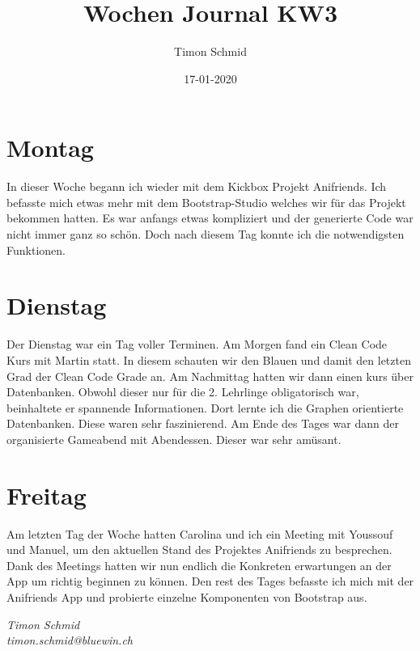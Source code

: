 \documentclass[12pt, titlepage]{article}
\title{Wochen Journal KW3}
\date{17-01-2020}
\author{Timon Schmid}
\begin{document}
  \maketitle

  \newpage


  \section{Montag}
  In dieser Woche begann ich wieder mit dem Kickbox Projekt Anifriends. Ich befasste mich etwas mehr
  mit dem Bootstrap-Studio welches wir für das Projekt bekommen hatten. Es war anfangs etwas
  kompliziert und der generierte Code war nicht immer ganz so schön. Doch nach diesem Tag
  konnte ich die notwendigsten Funktionen.

  \section{Dienstag}
  Der Dienstag war ein Tag voller Terminen. Am Morgen fand ein Clean Code Kurs mit Martin statt. In
  diesem schauten wir den Blauen und damit den letzten Grad der Clean Code Grade an. Am Nachmittag
  hatten wir dann einen kurs über Datenbanken. Obwohl dieser nur für die 2. Lehrlinge obligatorisch
  war, beinhaltete er spannende Informationen. Dort lernte ich die Graphen orientierte Datenbanken.
  Diese waren sehr faszinierend.
  Am Ende des Tages war dann der organisierte Gameabend mit Abendessen. Dieser war sehr amüsant.

  \section{Freitag}
  Am letzten Tag der Woche hatten Carolina und ich ein Meeting mit Youssouf und Manuel, um den aktuellen
  Stand des Projektes Anifriends zu besprechen. Dank des Meetings hatten wir nun endlich
  die Konkreten erwartungen an der App um richtig beginnen zu können. Den rest des Tages befasste ich
  mich mit der Anifriends App und probierte einzelne Komponenten von Bootstrap aus.

  \vspace*{\fill}
  \hfill \break
  \textit{Timon Schmid \\ timon.schmid@bluewin.ch}
\end{document}
